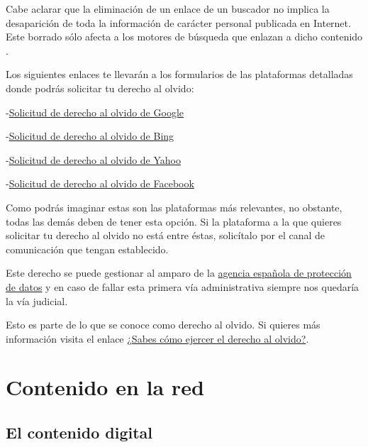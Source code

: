 \documentclass[
  spanish,
  a4paper,
  openany]{book}
\begin{document}
Cabe aclarar que la eliminación de un enlace de un buscador no implica la desaparición de toda la información de carácter personal publicada en Internet. Este borrado sólo afecta a los motores de búsqueda que enlazan a dicho contenido \citep{OSI-derecho-al-olvido}.

Los siguientes enlaces te llevarán a los formularios de las plataformas detalladas donde podrás solicitar tu derecho al olvido:

-\href{https://support.google.com/websearch/troubleshooter/3111061?hl=es}{Solicitud de derecho al olvido de Google}

-\href{https://help.bing.microsoft.com/\#apex/18/ES/10013/-1/ES}{Solicitud de derecho al olvido de Bing}

-\href{https://es-us.ayuda.yahoo.com/kb/Eliminaci\%C3\%B3n-de-resultados-de-b\%C3\%BAsqueda-de-Yahoo-Search-sln4530.html}{Solicitud de derecho al olvido de Yahoo}

-\href{https://www.facebook.com/help/217091804975136}{Solicitud de derecho al olvido de Facebook}

Como podrás imaginar estas son las plataformas más relevantes, no obstante, todas las demás deben de tener esta opción. Si la plataforma a la que quieres solicitar tu derecho al olvido no está entre éstas, solicítalo por el canal de comunicación que tengan establecido.

Este derecho se puede gestionar al amparo de la \href{https://www.aepd.es/es/areas-de-actuacion/internet-y-redes-sociales/derecho-al-olvido}{agencia española de protección de datos} y en caso de fallar esta primera vía administrativa siempre nos quedaría la vía judicial.

Esto es parte de lo que se conoce como derecho al olvido. Si quieres más información visita el enlace \href{https://www.osi.es/es/actualidad/blog/2018/09/19/sabes-como-ejercer-el-derecho-al-olvido}{¿Sabes cómo ejercer el derecho al olvido?}.

\hypertarget{contenido-en-la-red}{%
\chapter{Contenido en la red}\label{contenido-en-la-red}}

\hypertarget{el-contenido-digital}{%
\section{El contenido digital}\label{el-contenido-digital}}
\end{document}

